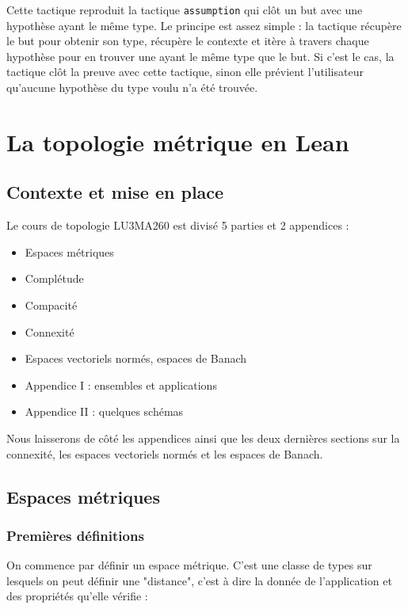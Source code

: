 \documentclass[a4paper, 12pt]{article}
\newcommand{\lean}[1]{\texttt{#1}}
\begin{document}
Cette tactique reproduit la tactique \lean{assumption} qui clôt un but avec une hypothèse ayant le même type. Le principe est assez simple : la tactique récupère le but pour obtenir son type, récupère le contexte et itère à travers chaque hypothèse pour en trouver une ayant le même type que le but. Si c'est le cas, la tactique clôt la preuve avec cette tactique, sinon elle prévient l'utilisateur qu'aucune hypothèse du type voulu n'a été trouvée.

\newpage
\section{La topologie métrique en Lean}

\subsection{Contexte et mise en place}

Le cours de topologie LU3MA260\cite{topology_memo} est divisé 5 parties et 2 appendices :

\begin{itemize}
    \item Espaces métriques
    \item Complétude
    \item Compacité
    \item Connexité
    \item Espaces vectoriels normés, espaces de Banach
    \item Appendice I : ensembles et applications
    \item Appendice II : quelques schémas
\end{itemize}

Nous laisserons de côté les appendices ainsi que les deux dernières sections sur la connexité, les espaces vectoriels normés et les espaces de Banach.

\subsection{Espaces métriques}

\subsubsection{Premières définitions}

On commence par définir un espace métrique. C'est une classe de types sur lesquels on peut définir une "distance", c'est à dire la donnée de l'application et des propriétés qu'elle vérifie :
\end{document}
